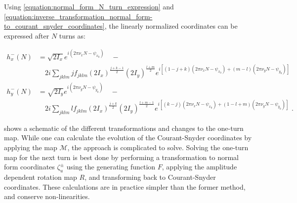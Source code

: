 Using \cref{equation:normal_form_N_turn_expression} and \cref{equation:inverse_transformation_normal_form-to_courant_snyder_coordinates}, the linearly normalized coordinates can be expressed after \(N\) turns as:

\begin{equation}
    \begin{aligned}
        h_x^{-}(N) & = \sqrt{2 I_x} e^{i \left( 2 \pi \nu_x N - \psi_{x_0} \right)} \quad - \\
        & \quad 2 i \sum_{jklm} j f_{jklm} \left( 2 I_x \right)^{\frac{j+k-1}{2}} \left( 2 I_y \right)^{\frac{l+m}{2}}   e^{i \left[ (1-j+k) \left( 2 \pi \nu_x N-\psi_{x_0} \right) + (m-l)   \left( 2 \pi \nu_y N - \psi_{y_0} \right) \right]} \\
        h_y^{-}(N) & = \sqrt{2 I_y} e^{i \left( 2 \pi \nu_y N - \psi_{y_0} \right)} \quad - \\
        & \quad 2 i \sum_{jklm} l f_{jklm} \left( 2 I_x \right)^{\frac{j+k}{2}}   \left( 2 I_y \right)^{\frac{l+m-1}{2}} e^{i \left[ (k-j)   \left( 2 \pi \nu_x N-\psi_{x_0} \right) + (1-l+m) \left( 2 \pi \nu_y N - \psi_{y_0} \right) \right]} \text{ .}
    \end{aligned}
    \label{equation:linearly_normalized_coordinates_after_N_turns}
\end{equation}


 shows a schematic of the different transformations and changes to the one-turn map.
While one can calculate the evolution of the Courant-Snyder coordinates by applying the map \( \mathcal{M} \), the approach is complicated to solve.
Solving the one-turn map for the next turn is best done by performing a transformation to normal form coordinates \(\zeta_{u}^{\pm}\) using the generating function \(F\), applying the amplitude dependent rotation map \(R\), and transforming back to Courant-Snyder coordinates.
These calculations are in practice simpler than the former method, and conserve non-linearities.

